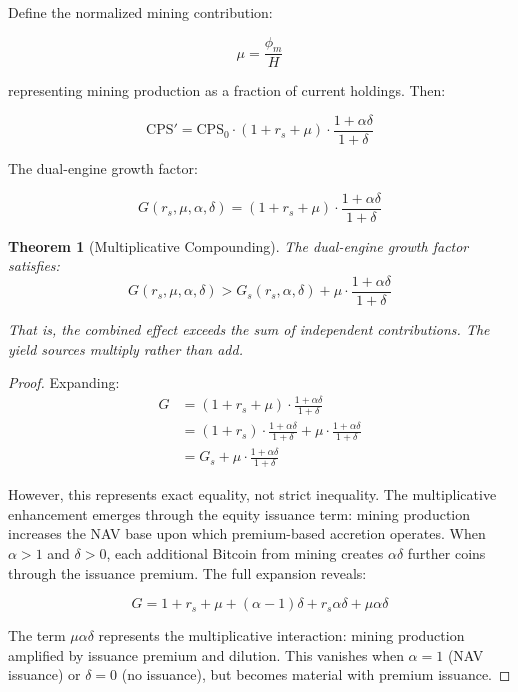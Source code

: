 \documentclass[
  journal=medium,
  manuscript=article-type,
  year=2025,
  volume=1,
]{cup-journal}
\newtheorem{theorem}{Theorem}
\theoremstyle{definition}
\begin{document}
Define the normalized mining contribution:

\begin{equation}
\mu = \frac{\phi_m}{H}
\end{equation}

representing mining production as a fraction of current holdings. Then:

\begin{equation}
\text{CPS}' = \text{CPS}_0 \cdot (1 + r_s + \mu) \cdot \frac{1 + \alpha\delta}{1 + \delta}
\end{equation}

The dual-engine growth factor:

\begin{equation}
G(r_s, \mu, \alpha, \delta) = (1 + r_s + \mu) \cdot \frac{1 + \alpha\delta}{1 + \delta}
\end{equation}

\begin{theorem}[Multiplicative Compounding]
The dual-engine growth factor satisfies:
\begin{equation}
G(r_s, \mu, \alpha, \delta) > G_s(r_s, \alpha, \delta) + \mu \cdot \frac{1 + \alpha\delta}{1 + \delta}
\end{equation}

That is, the combined effect exceeds the sum of independent contributions. The yield sources multiply rather than add.
\end{theorem}

\begin{proof}
Expanding:
\begin{align}
G &= (1 + r_s + \mu) \cdot \frac{1 + \alpha\delta}{1 + \delta} \\
&= (1 + r_s) \cdot \frac{1 + \alpha\delta}{1 + \delta} + \mu \cdot \frac{1 + \alpha\delta}{1 + \delta} \\
&= G_s + \mu \cdot \frac{1 + \alpha\delta}{1 + \delta}
\end{align}

However, this represents exact equality, not strict inequality. The multiplicative enhancement emerges through the equity issuance term: mining production increases the NAV base upon which premium-based accretion operates. When $\alpha > 1$ and $\delta > 0$, each additional Bitcoin from mining creates $\alpha\delta$ further coins through the issuance premium. The full expansion reveals:

\begin{equation}
G = 1 + r_s + \mu + (\alpha - 1)\delta + r_s \alpha \delta + \mu \alpha \delta
\end{equation}

The term $\mu \alpha \delta$ represents the multiplicative interaction: mining production amplified by issuance premium and dilution. This vanishes when $\alpha = 1$ (NAV issuance) or $\delta = 0$ (no issuance), but becomes material with premium issuance.
\end{proof}
\end{document}
